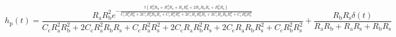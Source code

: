 \begin{equation}
h_{\mathrm{p}}{\left(t \right)} = \frac{R_{\mathrm{a}} R_{\mathrm{b}}^{2} e^{- \frac{t \left(R_{\mathrm{a}}^{2} R_{\mathrm{b}} + R_{\mathrm{a}}^{2} R_{\mathrm{s}} + R_{\mathrm{a}} R_{\mathrm{b}}^{2} + 2 R_{\mathrm{a}} R_{\mathrm{b}} R_{\mathrm{s}} + R_{\mathrm{b}}^{2} R_{\mathrm{s}}\right)}{C_{\mathrm{c}} R_{\mathrm{a}}^{2} R_{\mathrm{b}}^{2} + 2 C_{\mathrm{c}} R_{\mathrm{a}}^{2} R_{\mathrm{b}} R_{\mathrm{s}} + C_{\mathrm{c}} R_{\mathrm{a}}^{2} R_{\mathrm{s}}^{2} + 2 C_{\mathrm{c}} R_{\mathrm{a}} R_{\mathrm{b}}^{2} R_{\mathrm{s}} + 2 C_{\mathrm{c}} R_{\mathrm{a}} R_{\mathrm{b}} R_{\mathrm{s}}^{2} + C_{\mathrm{c}} R_{\mathrm{b}}^{2} R_{\mathrm{s}}^{2}}}}{C_{\mathrm{c}} R_{\mathrm{a}}^{2} R_{\mathrm{b}}^{2} + 2 C_{\mathrm{c}} R_{\mathrm{a}}^{2} R_{\mathrm{b}} R_{\mathrm{s}} + C_{\mathrm{c}} R_{\mathrm{a}}^{2} R_{\mathrm{s}}^{2} + 2 C_{\mathrm{c}} R_{\mathrm{a}} R_{\mathrm{b}}^{2} R_{\mathrm{s}} + 2 C_{\mathrm{c}} R_{\mathrm{a}} R_{\mathrm{b}} R_{\mathrm{s}}^{2} + C_{\mathrm{c}} R_{\mathrm{b}}^{2} R_{\mathrm{s}}^{2}} + \frac{R_{\mathrm{b}} R_{\mathrm{s}} \delta\left(t\right)}{R_{\mathrm{a}} R_{\mathrm{b}} + R_{\mathrm{a}} R_{\mathrm{s}} + R_{\mathrm{b}} R_{\mathrm{s}}}
\end{equation}

